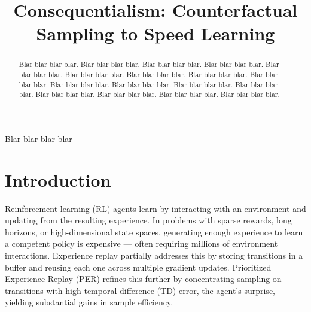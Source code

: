 \documentclass[conference]{IEEEtran}
\begin{document}
\title{Consequentialism: Counterfactual Sampling to Speed Learning}

\author{
\and
{}
}

\maketitle

\begin{abstract}
Blar blar blar blar. Blar blar blar blar. Blar blar blar blar. Blar blar blar blar. Blar blar blar blar. Blar blar blar blar. Blar blar blar blar. Blar blar blar blar. Blar blar blar blar. Blar blar blar blar. Blar blar blar blar. Blar blar blar blar. Blar blar blar blar. Blar blar blar blar. Blar blar blar blar. Blar blar blar blar. Blar blar blar blar.
\end{abstract}

\begin{IEEEkeywords}
 Blar blar blar blar
\end{IEEEkeywords}

\section{Introduction}
\noindent Reinforcement learning (RL) agents learn by interacting with an environment and updating from the resulting experience. In problems with sparse rewards, long horizons, or high-dimensional state spaces, generating enough experience to learn a competent policy is expensive — often requiring millions of environment interactions. Experience replay \cite{mnih2013playingatarideepreinforcement} partially addresses this by storing transitions in a buffer and reusing each one across multiple gradient updates. Prioritized Experience Replay (PER) \cite{schaul2016prioritizedexperiencereplay} refines this further by concentrating sampling on transitions with high temporal-difference (TD) error, the agent's surprise, yielding substantial gains in sample efficiency.
\end{document}
